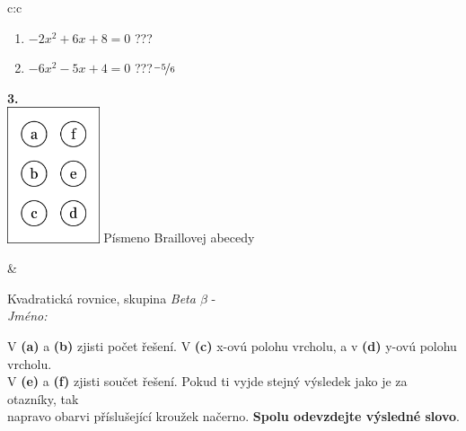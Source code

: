 \documentclass[10pt]{report}
\begin{document}
\begin{tabular}{c:c}
\begin{minipage}[c][104.5mm][t]{0.5\linewidth}
\begin{center}
\begin{minipage}{0.79\linewidth}
\begin{center}
\begin{varwidth}{\linewidth}
\begin{enumerate}
\item $-2x^2+6x+8=0$\quad \dotfill\; ???\;\dotfill {}
\item $-6x^2-5x+4=0$\quad \dotfill\; ???\;\dotfill \quad $\nicefrac{-5}{6}$
\end{enumerate}
\end{varwidth}
\end{center}
\end{minipage}
\begin{minipage}{0.20\linewidth}
\begin{center}
{\Huge\bfseries 3.} \\[2mm]
\includegraphics[height=40mm]{../images/braille.png}
{\small Písmeno Braillovej abecedy}
\end{center}
\end{minipage}
\end{center}
\end{minipage}
&
\begin{minipage}[c][104.5mm][t]{0.5\linewidth}
\begin{center}
\vspace{7mm}
{\huge Kvadratická rovnice, skupina \textit{Beta $\beta$} -}\\[5mm]
\textit{Jméno:}\phantom{xxxxxxxxxxxxxxxxxxxxxxxxxxxxxxxxxxxxxxxxxxxxxxxxxxxxxxxxxxxxxxxxx}\\[5mm]
\begin{minipage}{0.95\linewidth}
\begin{center}
V \textbf{(a)} a \textbf{(b)} zjisti počet řešení. V \textbf{(c)} x-ovú polohu vrcholu, a v \textbf{(d)} y-ovú polohu vrcholu.\\V \textbf{(e)} a \textbf{(f)} zjisti součet řešení. Pokud ti vyjde stejný výsledek jako je za otazníky, tak\\napravo obarvi příslušející kroužek načerno. \textbf{Spolu odevzdejte výsledné slovo}.
\end{center}
\end{minipage}
\\[1mm]
\begin{minipage}{0.79\linewidth}
\begin{center}

\end{center}
\end{minipage}
\end{center}
\end{minipage}
\end{tabular}
\end{document}

